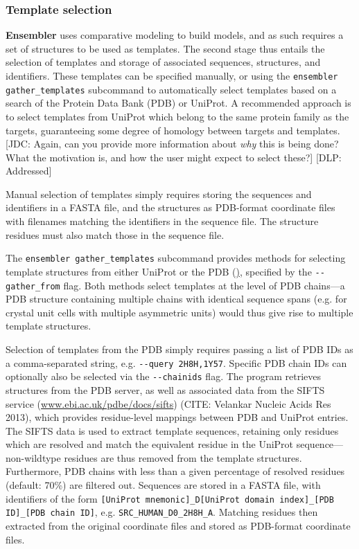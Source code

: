 \documentclass[aps,pre,twocolumn,nofootinbib,superscriptaddress,linenumbers]{revtex4-1}
\begin{document}
\subsubsection*{Template selection}

{\bf Ensembler} uses comparative modeling to build models, and as such requires a set of structures to be used as templates.
The second stage thus entails the selection of templates and storage of associated sequences, structures, and identifiers.
These templates can be specified manually, or using the {\tt ensembler gather\_templates} subcommand to automatically select templates based on a search of the Protein Data Bank (PDB) or UniProt.
A recommended approach is to select templates from UniProt which belong to the same protein family as the targets, guaranteeing some degree of homology between targets and templates.
{\color{red}[JDC: Again, can you provide more information about \emph{why} this is being done? What the motivation is, and how the user might expect to select these?]}
{\color{blue}[DLP: Addressed]}

Manual selection of templates simply requires storing the sequences and identifiers in a FASTA file, and the structures as PDB-format coordinate files with filenames matching the identifiers in the sequence file.
The structure residues must also match those in the sequence file.

The {\tt ensembler gather\_templates} subcommand provides methods for selecting template structures from either UniProt or the PDB (\href{http://www.rcsb.org/pdb}), specified by the {\tt -{}-gather\_from} flag.
Both methods select templates at the level of PDB chains---a PDB structure containing multiple chains with identical sequence spans (e.g. for crystal unit cells with multiple asymmetric units) would thus give rise to multiple template structures.

Selection of templates from the PDB simply requires passing a list of PDB IDs as a comma-separated string, e.g. {\tt -{}-query 2H8H,1Y57}.
Specific PDB chain IDs can optionally also be selected via the {\tt -{}-chainids} flag.
The program retrieves structures from the PDB server, as well as associated data from the SIFTS service (\href{http://www.ebi.ac.uk/pdbe/docs/sifts/}{www.ebi.ac.uk/pdbe/docs/sifts}) (CITE: Velankar Nucleic Acids Res 2013), which provides residue-level mappings between PDB and UniProt entries.
The SIFTS data is used to extract template sequences, retaining only residues which are resolved and match the equivalent residue in the UniProt sequence---non-wildtype residues are thus removed from the template structures.
Furthermore, PDB chains with less than a given percentage of resolved residues (default: 70\%) are filtered out.
Sequences are stored in a FASTA file, with identifiers of the form {\tt [UniProt mnemonic]\_D[UniProt domain index]\_[PDB ID]\_[PDB chain ID]}, e.g. {\tt SRC\_HUMAN\_D0\_2H8H\_A}.
Matching residues then extracted from the original coordinate files and stored as PDB-format coordinate files.
\end{document}
